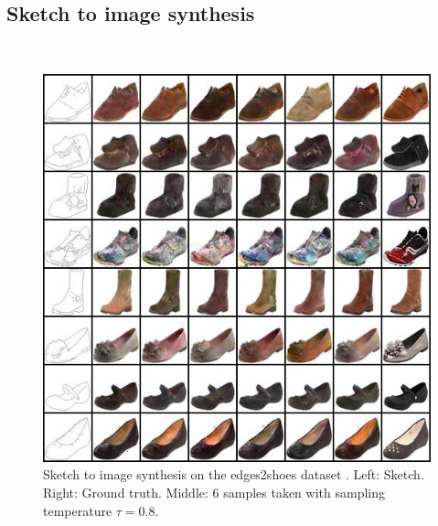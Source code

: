 \subsection{Sketch to image synthesis}\ 
\begin{figure}[h!]
    \centering
    \includegraphics[scale=0.75]{Chapter1/paper_graphs/SupplementaryMaterial/edges2shoes_T_0.8.png}
    \caption{Sketch to image synthesis on the edges2shoes dataset \cite{isola2017image}. Left: Sketch. Right: Ground truth. Middle: 6 samples taken with sampling temperature $\tau=0.8$.}
\end{figure}